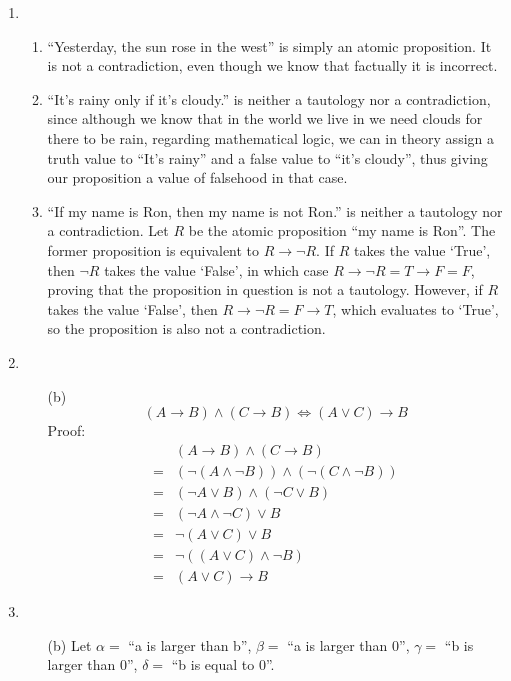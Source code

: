 \documentclass[fleqn]{article}
\begin{document}
\begin{enumerate}
	\item %
	\begin{enumerate}
		\item %
		``Yesterday, the sun rose in the west'' is simply an atomic proposition. It is not a contradiction, even though we know that factually it is incorrect.

		\item %
		``It's rainy only if it's cloudy.'' is neither a tautology nor a contradiction, since although we know that in the world we live in we need clouds for there to be rain, regarding mathematical logic, we can in theory assign a truth value to ``It's rainy'' and a false value to ``it's cloudy'', thus giving our proposition a value of falsehood in that case.

		\item %
		``If my name is Ron, then my name is not Ron.'' is neither a tautology nor a contradiction. Let \(R\) be the atomic proposition ``my name is Ron''. The former proposition is equivalent to \(R \rightarrow \lnot R\). If \(R\) takes the value `True', then \(\lnot R\) takes the value `False', in which case \(R \rightarrow \lnot R = T \rightarrow F = F\), proving that the proposition in question is not a tautology. However, if \(R\) takes the value `False', then \(R \rightarrow \lnot R = F \rightarrow T\), which evaluates to `True', so the proposition is also not a contradiction.
	\end{enumerate}

	\item %
	\begin{enumerate}
		\item[(b)]
		\[(A \rightarrow B) \land (C \rightarrow B) \Leftrightarrow (A \lor C) \rightarrow B\]
		Proof:
		\begin{align*}
			&(A \rightarrow B) \land (C \rightarrow B) \\
			= &(\lnot (A \land \lnot B)) \land (\lnot (C \land \lnot B)) \\
			= &(\lnot A \lor B) \land (\lnot C \lor B) \\
			= &(\lnot A \land \lnot C) \lor B \\
			= &\lnot (A \lor C) \lor B \\
			= &\lnot ((A \lor C) \land \lnot B) \\
			= &(A \lor C) \rightarrow B
		\end{align*}
	\end{enumerate}

	\item %
	\begin{enumerate}
		\item[(b)]
		Let \(\alpha = \) ``a is larger than b'', \(\beta = \) ``a is larger than 0'', \(\gamma = \) ``b is larger than 0'', \(\delta = \) ``b is equal to 0''.


\end{enumerate}
\end{enumerate}
\end{document}
